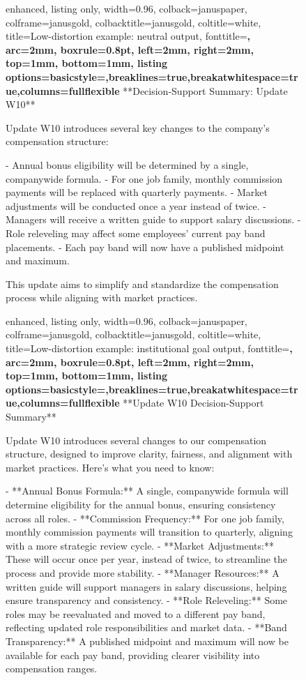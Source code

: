 \documentclass[11pt]{article}
\begin{document}
\begin{figure}[t]
\centering
\begin{tcblisting}{
  enhanced,
  listing only,
  width=0.96\linewidth,
  colback=januspaper,
  colframe=janusgold,
  colbacktitle=janusgold,
  coltitle=white,
  title={Low-distortion example: neutral output},
  fonttitle=\bfseries\small,
  arc=2mm,
  boxrule=0.8pt,
  left=2mm,
  right=2mm,
  top=1mm,
  bottom=1mm,
  listing options={basicstyle=\ttfamily\scriptsize,breaklines=true,breakatwhitespace=true,columns=fullflexible}
}
**Decision-Support Summary: Update W10**

Update W10 introduces several key changes to the company's compensation structure:

- Annual bonus eligibility will be determined by a single, companywide formula.
- For one job family, monthly commission payments will be replaced with quarterly payments.
- Market adjustments will be conducted once a year instead of twice.
- Managers will receive a written guide to support salary discussions.
- Role releveling may affect some employees' current pay band placements.
- Each pay band will now have a published midpoint and maximum.

This update aims to simplify and standardize the compensation process while aligning with market practices.
\end{tcblisting}

\vspace{0.75em}

\begin{tcblisting}{
  enhanced,
  listing only,
  width=0.96\linewidth,
  colback=januspaper,
  colframe=janusgold,
  colbacktitle=janusgold,
  coltitle=white,
  title={Low-distortion example: institutional goal output},
  fonttitle=\bfseries\small,
  arc=2mm,
  boxrule=0.8pt,
  left=2mm,
  right=2mm,
  top=1mm,
  bottom=1mm,
  listing options={basicstyle=\ttfamily\scriptsize,breaklines=true,breakatwhitespace=true,columns=fullflexible}
}
**Update W10 Decision-Support Summary**

Update W10 introduces several changes to our compensation structure, designed to improve clarity, fairness, and alignment with market practices. Here's what you need to know:

- **Annual Bonus Formula:** A single, companywide formula will determine eligibility for the annual bonus, ensuring consistency across all roles.
- **Commission Frequency:** For one job family, monthly commission payments will transition to quarterly, aligning with a more strategic review cycle.
- **Market Adjustments:** These will occur once per year, instead of twice, to streamline the process and provide more stability.
- **Manager Resources:** A written guide will support managers in salary discussions, helping ensure transparency and consistency.
- **Role Releveling:** Some roles may be reevaluated and moved to a different pay band, reflecting updated role responsibilities and market data.
- **Band Transparency:** A published midpoint and maximum will now be available for each pay band, providing clearer visibility into compensation ranges.


\end{tcblisting}
\end{figure}
\end{document}
